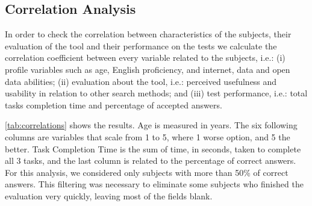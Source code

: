 \subsection{Correlation Analysis}

In order to check the correlation between characteristics of the subjects, their evaluation of the tool and their performance on the tests we calculate the correlation coefficient between every variable related to the subjects, i.e.: (i) profile variables such as age, English proficiency, and internet, data and open data abilities; (ii) evaluation about the tool, i.e.: perceived usefulness and usability in relation to other search methods; and (iii) test performance, i.e.: total tasks completion time and percentage of accepted answers.

\autoref{tab:correlations} shows the results.
Age is measured in years. The six following columns are variables that scale from 1 to 5, where 1 worse option, and 5 the better.
Task Completion Time is the sum of time, in seconds, taken to complete all 3 tasks, and the last column is related to the percentage of correct answers.
For this analysis, we considered only subjects with more than 50\% of correct answers.
This filtering was necessary to eliminate some subjects who finished the evaluation very quickly, leaving most of the fields blank.

